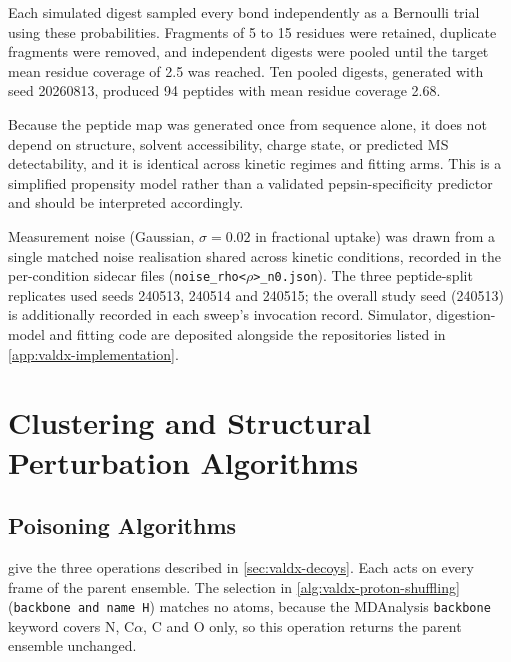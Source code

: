 Each simulated digest sampled every bond independently as a Bernoulli trial using these probabilities. Fragments of 5 to 15 residues were retained, duplicate fragments were removed, and independent digests were pooled until the target mean residue coverage of 2.5 was reached. Ten pooled digests, generated with seed 20260813, produced 94 peptides with mean residue coverage 2.68.

Because the peptide map was generated once from sequence alone, it does not depend on structure, solvent accessibility, charge state, or predicted MS detectability, and it is identical across kinetic regimes and fitting arms. This is a simplified propensity model rather than a validated pepsin-specificity predictor and should be interpreted accordingly.

Measurement noise (Gaussian, $\sigma=0.02$ in fractional uptake) was drawn from a single matched noise realisation shared across kinetic conditions, recorded in the per-condition sidecar files (\texttt{noise\_rho<$\rho$>\_n0.json}). The three peptide-split replicates used seeds 240513, 240514 and 240515; the overall study seed (240513) is additionally recorded in each sweep's invocation record. Simulator, digestion-model and fitting code are deposited alongside the repositories listed in \cref{app:valdx-implementation}.

\section{Clustering and Structural Perturbation Algorithms}
\label{app:valdx-perturbations}

\subsection{Poisoning Algorithms}
\label{app:valdx-poison-algorithms}

 give the three operations described in \cref{sec:valdx-decoys}. Each acts on every frame of the parent ensemble. The selection in \cref{alg:valdx-proton-shuffling} (\texttt{backbone and name H}) matches no atoms, because the MDAnalysis \texttt{backbone} keyword covers N, C$\alpha$, C and O only, so this operation returns the parent ensemble unchanged.

